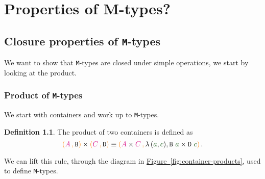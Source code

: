 \documentclass[twoside,11pt,openright]{report}
\theoremstyle{plain} %
\theoremstyle{definition}
\newtheorem{defn}[thm]{Definition}%
\theoremstyle{remark}
\newcommand*{\figref}[1]{\hyperref[fig:#1]{Figure~\ref*{fig:#1}}}
\newcommand*{\term}[1]{\textcolor{green!30!black}{#1}} %
\newcommand*{\type}[1]{\textcolor{magenta!90!black}{#1}}
\newcommand*{\containerpair}[2]{\ensuremath{\colorlet{savedleftcolor}{.}\color{orange}\left(\color{savedleftcolor}#1\,\textcolor{orange}{\mathbf{,}}\,#2\color{orange}\right)\color{savedleftcolor}}}
\newcommand*{\typeformer}[1]{\ensuremath{\mathtt{#1}}}
\begin{document}
\chapter{Properties of M-types?}
\section{Closure properties of \texttt{M}-types}
We want to show that \texttt{M}-types are closed under simple operations, we start by looking at the product.
\subsection{Product of \texttt{M}-types}
We start with containers and work up to \texttt{M}-types.
\begin{defn}
  The product of two containers is defined as \cite{ContainerRules}
  \begin{equation}
    \containerpair{\type{A}}{\typeformer{B}} \times \containerpair{\type{C}}{\typeformer{D}} \equiv \containerpair{\type{A} \times \type{C}}{\lambda\,(\term{a} , \term{c}), \typeformer{B}~\term{a} \times \typeformer{D}~\term{c}}.
  \end{equation}
\end{defn}
\noindent We can lift this rule, through the diagram in \figref{container-products}, used to define \texttt{M}-types.
\end{document}
